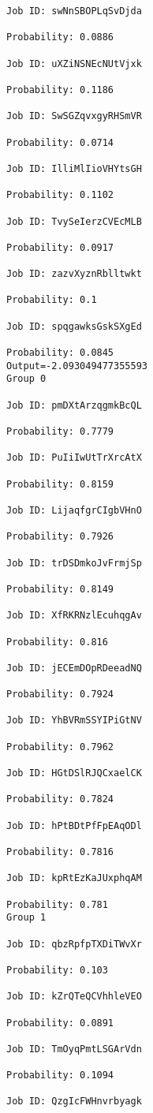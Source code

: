 \documentclass[11pt]{article}
\begin{document}
\begin{Verbatim}[commandchars=\\\{\}]
Job ID: swNnSBOPLqSvDjda

Probability: 0.0886

Job ID: uXZiNSNEcNUtVjxk

Probability: 0.1186

Job ID: SwSGZqvxgyRHSmVR

Probability: 0.0714

Job ID: IlliMlIioVHYtsGH

Probability: 0.1102

Job ID: TvySeIerzCVEcMLB

Probability: 0.0917

Job ID: zazvXyznRblltwkt

Probability: 0.1

Job ID: spqgawksGskSXgEd

Probability: 0.0845
Output=-2.093049477355593
Group 0

Job ID: pmDXtArzqgmkBcQL

Probability: 0.7779

Job ID: PuIiIwUtTrXrcAtX

Probability: 0.8159

Job ID: LijaqfgrCIgbVHnO

Probability: 0.7926

Job ID: trDSDmkoJvFrmjSp

Probability: 0.8149

Job ID: XfRKRNzlEcuhqgAv

Probability: 0.816

Job ID: jECEmDOpRDeeadNQ

Probability: 0.7924

Job ID: YhBVRmSSYIPiGtNV

Probability: 0.7962

Job ID: HGtDSlRJQCxaelCK

Probability: 0.7824

Job ID: hPtBDtPfFpEAqODl

Probability: 0.7816

Job ID: kpRtEzKaJUxphqAM

Probability: 0.781
Group 1

Job ID: qbzRpfpTXDiTWvXr

Probability: 0.103

Job ID: kZrQTeQCVhhleVEO

Probability: 0.0891

Job ID: TmOyqPmtLSGArVdn

Probability: 0.1094

Job ID: QzgIcFWHnvrbyagk


\end{Verbatim}
\end{document}
